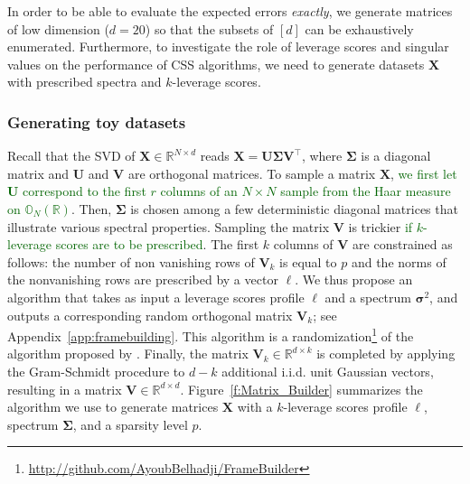 \documentclass[twoside,11pt]{book}
\newcommand{\rev}[1]{\textcolor{darkgreen}{#1}}
\numberwithin{theorem}{chapter}
\numberwithin{definition}{chapter}
\numberwithin{proposition}{chapter}
\numberwithin{corollary}{chapter}
\numberwithin{example}{chapter}
\numberwithin{lemma}{chapter}
\DeclareMathOperator{\Tran}{\intercal}
\newcommand{\rb}[1]{\textcolor{magenta}{#1}}
\begin{document}
In order to be able to evaluate the expected errors \emph{exactly}, we generate matrices of low dimension ($d = 20$) so that the subsets of $[d]$ can be exhaustively enumerated. Furthermore, to investigate the role of leverage scores and singular values on the performance of CSS algorithms, we need to generate datasets $\bm{X}$ with prescribed spectra and $k$-leverage scores.

\subsubsection{Generating toy datasets}
Recall that the SVD of $\bm{X}\in\mathbb{R}^{N\times d}$ reads $\bm{X} = \bm{U}\bm{\Sigma}\bm{V}^{\Tran}$, where $\bm{\Sigma}$ is a diagonal matrix and $\bm{U}$ and $\bm{V}$ are orthogonal matrices. To sample a matrix $\bm{X}$, \rev{we first let $\bm{U}$ correspond to the first $r$ columns of an $N \times N$ sample from the Haar measure on $\mathbb{O}_{N}(\mathbb{R})$}. Then, $\bm{\Sigma}$ is chosen among a few deterministic diagonal matrices that illustrate various spectral properties. Sampling the matrix $\bm{V}$ is trickier \rev{if $k$-leverage scores are to be prescribed}. The first $k$ columns of $\bm{V}$ are constrained as follows: the number of non vanishing rows of $\bm{V}_{k}$ is equal to $p$ and the norms of the nonvanishing rows are prescribed by a vector $\bm{\ell}$.
We thus propose an algorithm that takes as input a leverage scores profile $\bm{\ell}$ and a spectrum $\bm{\sigma}^2$, and outputs a corresponding random orthogonal matrix $\bm{V}_k$; see Appendix~\ref{app:framebuilding}. This algorithm is a randomization\footnote{\url{http://github.com/AyoubBelhadji/FrameBuilder}} of the algorithm proposed by \cite*{FMPS13}.  Finally, the matrix $\bm{V}_{k} \in \mathbb{R}^{d \times k}$ is completed by applying the Gram-Schmidt procedure to $d-k$ additional i.i.d. unit Gaussian vectors, resulting in a matrix $\bm{V} \in \mathbb{R}^{d \times d}$. Figure~\ref{f:Matrix_Builder} summarizes the algorithm we use to generate matrices $\bm{X}$ with a $k$-leverage scores profile $\bm{\ell}$, spectrum $\bm{\Sigma}$, and a sparsity level $p$.
\end{document}
